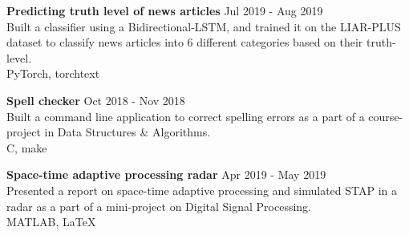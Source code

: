\documentclass[letterpaper]{article}
\renewenvironment{itemize}{
  \begin{list}{}{
    \setlength{\leftmargin}{1.5em}
  }
}{
  \end{list}
}
\newcommand{\smallGreyFont}[1]{\textcolor{black!80}{\small{#1}}}
\begin{document}
\begin{itemize}
    \item
    \textbf{Predicting truth level of news articles}
    \hfill{\smallGreyFont{Jul 2019 - Aug 2019}}\\
      Built a classifier using a Bidirectional-LSTM, and trained it on the LIAR-PLUS dataset to classify news articles into 6 different categories based on their truth-level.\\
      \smallGreyFont{PyTorch, torchtext}

    \item
    \textbf{Spell checker}
    \hfill{\smallGreyFont{Oct 2018 - Nov 2018}}\\
      Built a command line application to correct spelling errors as a part of a course-project in Data Structures \& Algorithms.\\
      \smallGreyFont{C, make}

    \item
    \textbf{Space-time adaptive processing radar}
    \hfill{\smallGreyFont{Apr 2019 - May 2019}}\\
      Presented a report on space-time adaptive processing and simulated STAP in a radar as a part of a mini-project on Digital Signal Processing.\\
      \smallGreyFont{MATLAB, \LaTeX}

  \end{itemize}


\end{document}
